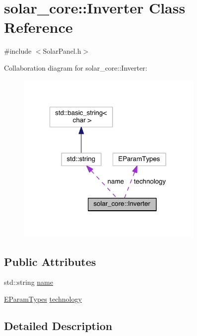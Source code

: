 \hypertarget{classsolar__core_1_1_inverter}{}\section{solar\+\_\+core\+:\+:Inverter Class Reference}
\label{classsolar__core_1_1_inverter}


{\ttfamily \#include $<$Solar\+Panel.\+h$>$}



Collaboration diagram for solar\+\_\+core\+:\+:Inverter\+:\nopagebreak
\begin{figure}[H]
\begin{center}
\leavevmode
\includegraphics[width=256pt]{classsolar__core_1_1_inverter__coll__graph}
\end{center}
\end{figure}
\subsection*{Public Attributes}
\begin{DoxyCompactItemize}
\item 
std\+::string \hyperlink{classsolar__core_1_1_inverter_a0a63c42804f6d96c298f11c1425075d2}{name}
\item 
\hyperlink{namespacesolar__core_aa1147341e5ef7a40d68d1bd68e149362}{E\+Param\+Types} \hyperlink{classsolar__core_1_1_inverter_a793b76816cee47c3348f8854b0fec9b1}{technology}
\end{DoxyCompactItemize}


\subsection{Detailed Description}


